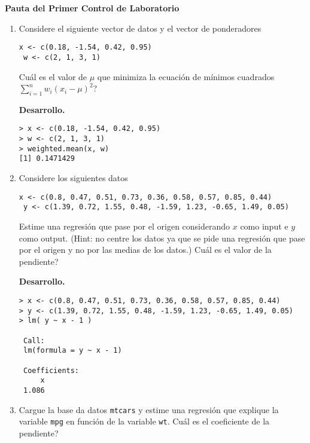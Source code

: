 \documentclass[11pt,oneside,spanish]{article}
\theoremstyle{definition}
\theoremstyle{definition}\newtheorem{definicion}{Definicin}
\theoremstyle{definition}\newtheorem{ejemplo}{Ejemplo}
\theoremstyle{remark}\newtheorem{nota}{\textsc{Nota}}
\theoremstyle{definition}\newtheorem{proposicion}{Proposicin}
\theoremstyle{definition}\newtheorem{problema}{Problema}
\begin{document}
\begin{center}
\textbf{Pauta del Primer Control de Laboratorio} 
\end{center}

\bigskip

\begin{enumerate}[(1)]
\item Considere el siguiente vector de datos y el vector de ponderadores
\begin{lstlisting}[backgroundcolor=\color{Gray!20},frame=none,basicstyle=\ttfamily]
 x <- c(0.18, -1.54, 0.42, 0.95)
 w <- c(2, 1, 3, 1)
\end{lstlisting}
{\textquestiondown}Cu\'al es el valor de $\mu$ que minimiza la ecuaci\'on de m\'inimos cuadrados $\sum_{i=1}^n w_i(x_i-\mu)^2$?

\textbf{Desarrollo.}
\begin{lstlisting}[backgroundcolor=\color{Gray!20},frame=none,basicstyle=\ttfamily]
> x <- c(0.18, -1.54, 0.42, 0.95)
> w <- c(2, 1, 3, 1)
> weighted.mean(x, w)
[1] 0.1471429\end{lstlisting}
	
\item Considere los siguientes datos
\begin{lstlisting}[backgroundcolor=\color{Gray!20},frame=none,basicstyle=\ttfamily]
 x <- c(0.8, 0.47, 0.51, 0.73, 0.36, 0.58, 0.57, 0.85, 0.44)
 y <- c(1.39, 0.72, 1.55, 0.48, -1.59, 1.23, -0.65, 1.49, 0.05)
\end{lstlisting}
Estime una regresi\'on que pase por el origen considerando $x$ como input e $y$ como output. (Hint: no centre los datos ya que se pide una regresi\'on 	que pase por el origen y no por las medias de los datos.)
{\textquestiondown}Cu\'al es el valor de la pendiente?

\textbf{Desarrollo.}
\begin{lstlisting}[backgroundcolor=\color{Gray!20},frame=none,basicstyle=\ttfamily]
> x <- c(0.8, 0.47, 0.51, 0.73, 0.36, 0.58, 0.57, 0.85, 0.44)
> y <- c(1.39, 0.72, 1.55, 0.48, -1.59, 1.23, -0.65, 1.49, 0.05)
> lm( y ~ x - 1 )

 Call:
 lm(formula = y ~ x - 1)

 Coefficients:
     x   
 1.086 
\end{lstlisting}
	
\item Cargue la  base da datos \texttt{mtcars} y estime una regresi\'on que explique la variable \texttt{mpg} en funci\'on de la variable \texttt{wt}. {\textquestiondown}Cu\'al es el coeficiente de la pendiente?	


\end{enumerate}
\end{document}
